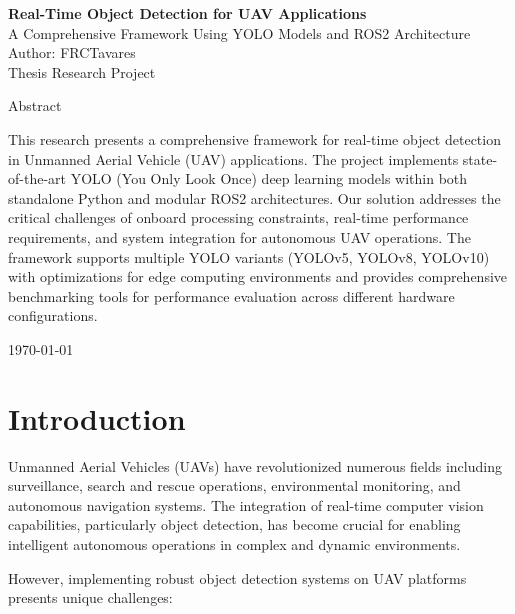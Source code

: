 \documentclass[11pt,a4paper]{article}
\begin{document}
\begin{titlepage}
    \centering
    \vspace*{2cm}
    
    {\huge\bfseries Real-Time Object Detection for UAV Applications}\\[0.5cm]
    {\LARGE A Comprehensive Framework Using YOLO Models and ROS2 Architecture}\\[2cm]
    
    {\Large Author: FRCTavares}\\[0.5cm]
    {\large Thesis Research Project}\\[1cm]
    
    \vspace{2cm}
    
    {\large Abstract}\\[0.5cm]
    \begin{minipage}{0.8\textwidth}
        \centering
        This research presents a comprehensive framework for real-time object detection in Unmanned Aerial Vehicle (UAV) applications. The project implements state-of-the-art YOLO (You Only Look Once) deep learning models within both standalone Python and modular ROS2 architectures. Our solution addresses the critical challenges of onboard processing constraints, real-time performance requirements, and system integration for autonomous UAV operations. The framework supports multiple YOLO variants (YOLOv5, YOLOv8, YOLOv10) with optimizations for edge computing environments and provides comprehensive benchmarking tools for performance evaluation across different hardware configurations.
    \end{minipage}
    
    \vfill
    {\large \today}
\end{titlepage}

\newpage
\tableofcontents
\newpage

\section{Introduction}

Unmanned Aerial Vehicles (UAVs) have revolutionized numerous fields including surveillance, search and rescue operations, environmental monitoring, and autonomous navigation systems. The integration of real-time computer vision capabilities, particularly object detection, has become crucial for enabling intelligent autonomous operations in complex and dynamic environments.

However, implementing robust object detection systems on UAV platforms presents unique challenges:
\end{document}
